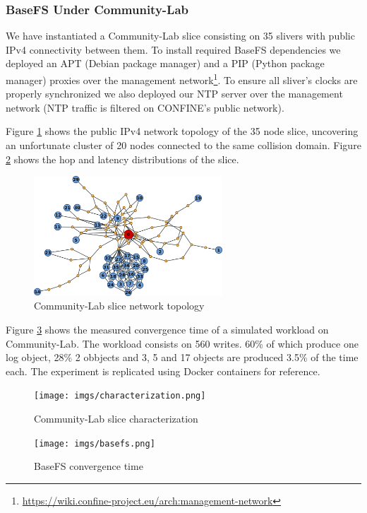 \documentclass{sig-alternate}
\begin{document}
\subsubsection{BaseFS Under Community-Lab}

We have instantiated a Community-Lab slice consisting on 35 slivers with public IPv4 connectivity between them. To install required BaseFS dependencies we deployed an APT (Debian package manager) and a PIP (Python package manager) proxies over the management network\footnote{\url{https://wiki.confine-project.eu/arch:management-network}}. To ensure all sliver's clocks are properly synchronized we also deployed our NTP server over the management network (NTP traffic is filtered on CONFINE's public network).

Figure \ref{fig:topology} shows the public IPv4 network topology of the 35 node slice, uncovering an unfortunate cluster of 20 nodes connected to the same collision domain. Figure \ref{fig:characterization} shows the hop and latency distributions of the slice.


\begin{figure}
\centering
\includegraphics[width=200pt]{imgs/topology.png}
\caption{Community-Lab slice network topology}
\label{fig:topology}
\end{figure}

Figure \ref{fig:basefs} shows the measured convergence time of a simulated workload on Community-Lab. The workload consists on 560 writes. 60\% of which produce one log object, 28\% 2 obbjects and 3, 5 and 17 objects are produced 3.5\% of the time each. The experiment is replicated using Docker containers for reference.


\begin{figure}
\centering
\texttt{[image: imgs/characterization.png]}
\caption{Community-Lab slice characterization}
\label{fig:characterization}
\end{figure}


\begin{figure}
\centering
\texttt{[image: imgs/basefs.png]}
\caption{BaseFS convergence time}
\label{fig:basefs}
\end{figure}
\end{document}
